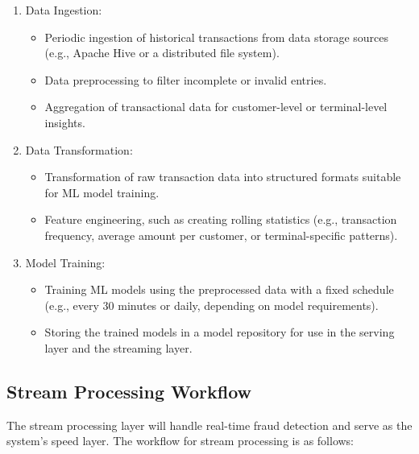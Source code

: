 \documentclass[12pt,a4paper, hidelinks]{article}
\begin{document}
\begin{enumerate}
    \item Data Ingestion:
        \begin{itemize}
            \item Periodic ingestion of historical transactions from data storage sources (e.g., Apache Hive or a distributed file system).
            \item Data preprocessing to filter incomplete or invalid entries.
            \item Aggregation of transactional data for customer-level or terminal-level insights.
        \end{itemize}
    \item Data Transformation:
        \begin{itemize}
            \item Transformation of raw transaction data into structured formats suitable for ML model training.
            \item Feature engineering, such as creating rolling statistics (e.g., transaction frequency, average amount per customer, or terminal-specific patterns).
        \end{itemize}
    \item Model Training:
        \begin{itemize}
            \item Training ML models using the preprocessed data with a fixed schedule (e.g., every 30 minutes or daily, depending on model requirements).
            \item Storing the trained models in a model repository for use in the serving layer and the streaming layer.
        \end{itemize}
\end{enumerate}

\subsection{Stream Processing Workflow}
The stream processing layer will handle real-time fraud detection and serve as the system's speed layer. The workflow for stream processing is as follows:
\end{document}

